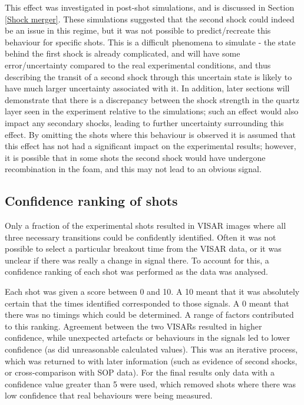 This effect was investigated in post-shot simulations, and is discussed in Section \ref{Shock merger}. These simulations suggested that the second shock could indeed be an issue in this regime, but it was not possible to predict/recreate this behaviour for specific shots. This is a difficult phenomena to simulate - the state behind the first shock is already complicated, and will have some error/uncertainty compared to the real experimental conditions, and thus describing the transit of a second shock through this uncertain state is likely to have much larger uncertainty associated with it. In addition, later sections will demonstrate that there is a discrepancy between the shock strength in the quartz layer seen in the experiment relative to the simulations; such an effect would also impact any secondary shocks, leading to further uncertainty surrounding this effect. By omitting the shots where this behaviour is observed it is assumed that this effect has not had a significant impact on the experimental results; however, it is possible that in some shots the second shock would have undergone recombination in the foam, and this may not lead to an obvious signal.

\subsection{Confidence ranking of shots} \label{Confidence}
Only a fraction of the experimental shots resulted in VISAR images where all three necessary transitions could be confidently identified. Often it was not possible to select a particular breakout time from the VISAR data, or it was unclear if there was really a change in signal there. To account for this, a confidence ranking of each shot was performed as the data was analysed.

Each shot was given a score between 0 and 10. A 10 meant that it was absolutely certain that the times identified corresponded to those signals. A 0 meant that there was no timings which could be determined. A range of factors contributed to this ranking. Agreement between the two VISARs resulted in higher confidence, while unexpected artefacts or behaviours in the signals led to lower confidence (as did unreasonable calculated values). This was an iterative process, which was returned to with later information (such as evidence of second shocks, or cross-comparison with SOP data). For the final results only data with a confidence value greater than 5 were used, which removed shots where there was low confidence that real behaviours were being measured. 


